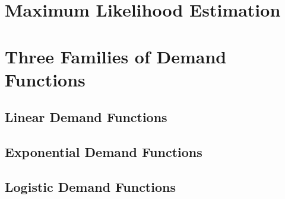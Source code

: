 \section{Maximum Likelihood Estimation}


\section{Three Families of Demand Functions}

\subsection{Linear Demand Functions}


\subsection{Exponential Demand Functions}


\subsection{Logistic Demand Functions}